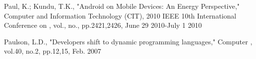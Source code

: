 \documentclass{sigplanconf}
\begin{document}
\begin{thebibliography}{}
  Paul, K.; Kundu, T.K., "Android on Mobile Devices: An Energy Perspective," Computer and Information Technology (CIT), 2010 IEEE 10th International Conference on , vol., no., pp.2421,2426, June 29 2010-July 1 2010

  Paulson, L.D., "Developers shift to dynamic programming languages," Computer , vol.40, no.2, pp.12,15, Feb. 2007


\end{thebibliography}
\end{document}
